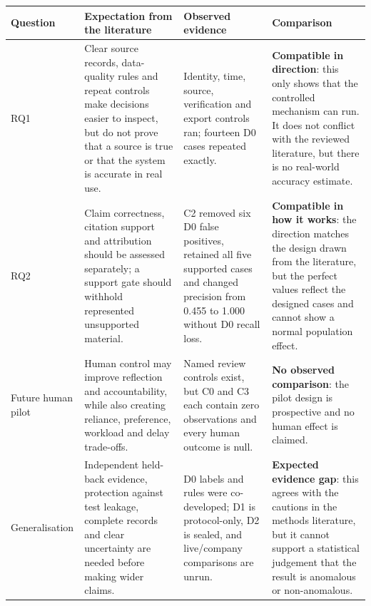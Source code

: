 \begin{table}[p]
  \centering
  \scriptsize
  \setlength{\tabcolsep}{4pt}
  \renewcommand{\arraystretch}{1.12}
  \begin{tabularx}{\textwidth}{@{}P{0.12\textwidth}P{0.25\textwidth}P{0.25\textwidth}Y@{}}
    \toprule
    \textbf{Question} & \textbf{Expectation from the literature} & \textbf{Observed evidence} & \textbf{Comparison} \\
    \midrule
    RQ1 &
    Clear source records, data-quality rules and repeat controls make decisions easier to inspect,
    but do not prove that a source is true or that the system is accurate in real use. &
    Identity, time, source, verification and export controls ran; fourteen D0 cases repeated
    exactly. &
    \textbf{Compatible in direction}: this only shows that the controlled mechanism can run. It does
    not conflict with the reviewed literature, but there is no real-world accuracy estimate. \\
    \addlinespace
    RQ2 &
    Claim correctness, citation support and attribution should be assessed separately; a support gate
    should withhold represented unsupported material. &
    C2 removed six D0 false positives, retained all five supported cases and changed precision from
    0.455 to 1.000 without D0 recall loss. &
    \textbf{Compatible in how it works}: the direction matches the design drawn from the literature,
    but the perfect values reflect the designed cases and cannot show a normal population effect. \\
    \addlinespace
    Future human pilot &
    Human control may improve reflection and accountability, while also creating reliance, preference,
    workload and delay trade-offs. &
    Named review controls exist, but C0 and C3 each contain zero observations and every human outcome
    is null. &
    \textbf{No observed comparison}: the pilot design is prospective and no human effect is claimed. \\
    \addlinespace
    Generalisation &
    Independent held-back evidence, protection against test leakage, complete records and clear
    uncertainty are needed before making wider claims. &
    D0 labels and rules were co-developed; D1 is protocol-only, D2 is sealed, and live/company
    comparisons are unrun. &
    \textbf{Expected evidence gap}: this agrees with the cautions in the methods literature, but it
    cannot support a statistical judgement that the result is anomalous or non-anomalous. \\
    \bottomrule
  \end{tabularx}


\end{table}
